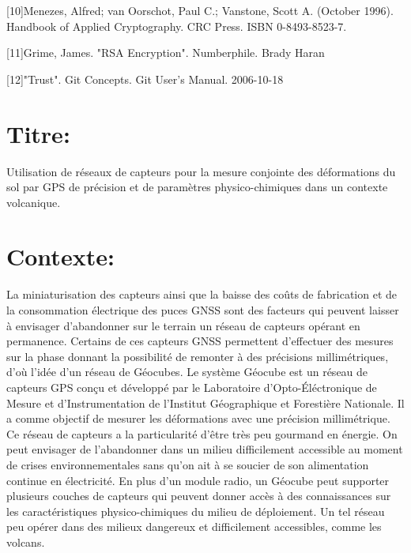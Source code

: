 \documentclass{themeensg}
\begin{document}
[10]Menezes, Alfred; van Oorschot, Paul C.; Vanstone, Scott A. (October 1996). Handbook of Applied Cryptography. CRC Press. ISBN 0-8493-8523-7.

[11]Grime, James. "RSA Encryption". Numberphile. Brady Haran

[12]"Trust". Git Concepts. Git User's Manual. 2006-10-18




\newevenpage
\nocite{*}



\newevenpage
\begin{appendices} 
\label{beginappendices}
\label{annexekalman}
\section*{Titre:}
Utilisation de réseaux de capteurs pour la mesure conjointe des déformations du sol par GPS de précision et de paramètres physico-chimiques dans un contexte volcanique.
\section*{Contexte:}
La miniaturisation des capteurs ainsi que la baisse des coûts de fabrication et de la consommation électrique des puces GNSS sont des facteurs qui peuvent laisser à envisager d'abandonner sur le terrain un réseau de capteurs opérant en permanence. Certains de ces capteurs GNSS permettent d'effectuer des mesures sur la phase donnant la possibilité de remonter à des précisions millimétriques, d'où l'idée d'un réseau de Géocubes. Le système Géocube est un réseau de capteurs GPS conçu et développé par le Laboratoire d'Opto-Éléctronique de Mesure et d'Instrumentation de l'Institut Géographique et Forestière Nationale. Il a comme objectif de mesurer les déformations avec une précision millimétrique. Ce réseau de capteurs a la particularité d'être très peu gourmand en énergie. On peut envisager de l'abandonner dans un milieu difficilement accessible au moment de crises environnementales sans qu'on ait à se soucier de son alimentation continue en électricité. En plus d'un module radio, un Géocube peut supporter plusieurs couches de capteurs qui peuvent donner accès à des connaissances sur les caractéristiques physico-chimiques du milieu de déploiement. Un tel réseau peu opérer dans des milieux dangereux et difficilement accessibles, comme les volcans.


\end{appendices}
\end{document}
